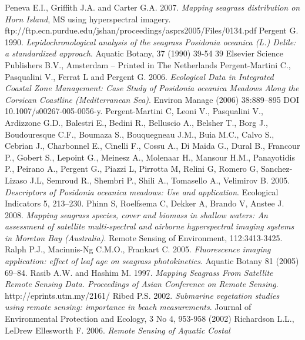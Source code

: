 \documentclass[10pt, a4paper]{article}
\begin{document}
\begin{thebibliography}{999}
Peneva E.I., Griffith J.A. and Carter G.A. 2007. \emph{Mapping seagrass distribution on Horn
Island}, MS using hyperspectral imagery.
ftp://ftp.ecn.purdue.edu/jshan/proceedings/asprs2005/Files/0134.pdf \pageref{Peneva07}
Pergent G. 1990. \emph{Lepidochronological analysis of the seagrass \textit{Posidonia oceanica} (L.)
Delile: a standardized approach}. Aquatic Botany, 37 (1990) 39-54 39 Elsevier Science
Publishers B.V., Amsterdam -- Printed in The Netherlands \pageref{Pergent90}
Pergent-Martini C., Pasqualini V., Ferrat L and Pergent G. 2006. \emph{Ecological Data in
Integrated Coastal Zone Management: Case Study of \textit{Posidonia oceanica} Meadows Along
the Corsican Coastline (Mediterranean Sea)}. Environ Manage (2006) 38:889–895 DOI
10.1007/s00267-005-0056-y. \pageref{Pergent-Martini06}
Pergent-Martini C, Leoni V., Pasqualini V., Ardizzone G.D., Balestri E., Bedini R.,
Belluscio A., Belsher T., Borg J., Boudouresque C.F., Boumaza S., Bouquegneau J.M., Buia
M.C., Calvo S., Cebrian J., Charbonnel E., Cinelli F., Cossu A., Di Maida G., Dural B.,
Francour P., Gobert S., Lepoint G., Meinesz A., Molenaar H., Mansour H.M., Panayotidis
P., Peirano A., Pergent G., Piazzi L, Pirrotta M, Relini G, Romero G, Sanchez-Lizaso J.L,
Semroud R., Shembri P., Shili A., Tomasello A., Velimirov B. 2005. \emph{Descriptors of
\textit{Posidonia oceanica} meadows: Use and application}. Ecological Indicators 5, 213–230. \pageref{Pergent-Martini05}
Phinn S, Roelfsema C, Dekker A, Brando V, Anstee J. 2008. \emph{Mapping seagrass species,
cover and biomass in shallow waters: An assessment of satellite multi-spectral and airborne
hyperspectral imaging systems in Moreton Bay (Australia)}. Remote Sensing of
Environment, 112:3413-3425. \pageref{Phinn08}
Ralph P.J., Macinnis-Ng C.M.O., Frankart C. 2005. \emph{Fluorescence imaging application:
effect of leaf age on seagrass photokinetics}. Aquatic Botany 81 (2005) 69–84. \pageref{Ralph05}
Rasib A.W. and Hashim M. 1997. \emph{Mapping Seagrass From Satellite Remote Sensing
Data. Proceedings of Asian Conference on Remote Sensing}. http://eprints.utm.my/2161/ \pageref{Rasib97}
Ribed P.S. 2002. \emph{Submarine vegetation studies using remote sensing: importance in
beach measurements}. Journal of Environmental Protection and Ecology, 3 No 4, 953-958
(2002) \pageref{Ribed02}
Richardson L.L., LeDrew Ellesworth F. 2006. \emph{Remote Sensing of Aquatic Costal
}
\end{thebibliography}
\end{document}
